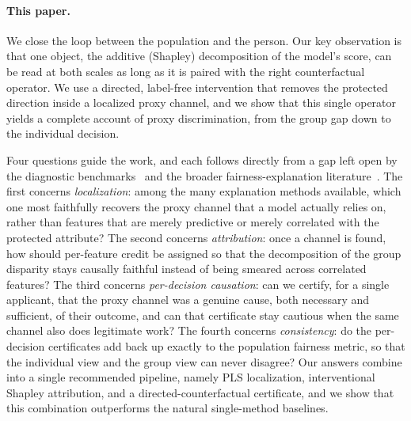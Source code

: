 \documentclass[sn-mathphys-num]{sn-jnl}
\begin{document}
\paragraph{This paper.}
We close the loop between the population and the person. Our key observation is
that one object, the additive (Shapley) decomposition of the model's score, can
be read at both scales as long as it is paired with the right counterfactual
operator. We use a directed, label-free intervention that removes the protected
direction inside a localized proxy channel, and we show that this single operator
yields a complete account of proxy discrimination, from the group gap down to the
individual decision.

Four questions guide the work, and each follows directly from a gap left open by
the diagnostic benchmarks~\cite{pena2020faircv,vladimirova2024fairjob} and the
broader fairness-explanation literature~\cite{mehrabi2021survey}. The first
concerns \emph{localization}: among the many explanation methods available, which
one most faithfully recovers the proxy channel that a model actually relies on,
rather than features that are merely predictive or merely correlated with the
protected attribute? The second concerns \emph{attribution}: once a channel is
found, how should per-feature credit be assigned so that the decomposition of the
group disparity stays causally faithful instead of being smeared across
correlated features? The third concerns \emph{per-decision causation}: can we
certify, for a single applicant, that the proxy channel was a genuine cause, both
necessary and sufficient, of their outcome, and can that certificate stay
cautious when the same channel also does legitimate work? The fourth concerns
\emph{consistency}: do the per-decision certificates add back up exactly to the
population fairness metric, so that the individual view and the group view can
never disagree? Our answers combine into a single recommended pipeline, namely
PLS localization, interventional Shapley attribution, and a directed-counterfactual
certificate, and we show that this combination outperforms the natural
single-method baselines.
\end{document}
